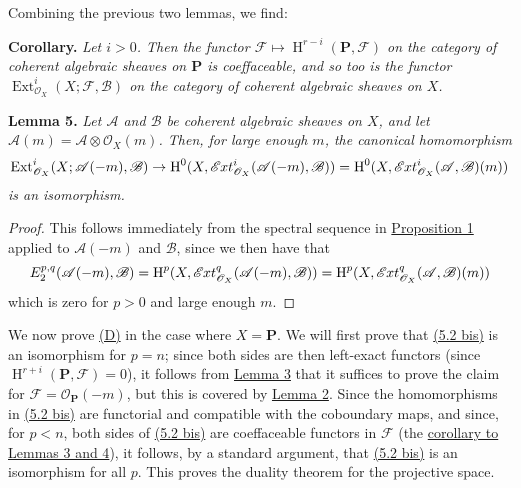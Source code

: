 \documentclass{article}
\newenvironment{itenv}[1]
  {\phantomsection\par\smallskip\noindent\textbf{#1.}\itshape}
  {\par\smallskip}
\newcommand{\oldpage}[1]{\marginpar{\footnotesize$\Big\vert$ \textit{p.~#1}}}
\theoremstyle{definition}
\theoremstyle{definition}
\theoremstyle{definition}
\theoremstyle{definition}
\theoremstyle{remark}
\begin{document}
Combining the previous two lemmas, we find:

\leavevmode{}%
\begin{itenv}{Corollary}
Let \(i>0\).
Then the functor \({\mathscr{F}}\mapsto\operatorname{H}^{r-i}(\mathbf{P},{\mathscr{F}})\) on the category of coherent algebraic sheaves on \(\mathbf{P}\) is coeffaceable, and so too is the functor \(\operatorname{Ext}_{{\mathscr{O}}_X}^i(X;{\mathscr{F}},{\mathscr{B}})\) on the category of coherent algebraic sheaves on \(X\).

\end{itenv}

\leavevmode{}%
\begin{itenv}{Lemma 5}
\oldpage{149-16}Let \({\mathscr{A}}\) and \({\mathscr{B}}\) be coherent algebraic sheaves on \(X\), and let \({\mathscr{A}}(m)={\mathscr{A}}\otimes{\mathscr{O}}_X(m)\).
Then, for large enough \(m\), the canonical homomorphism
\[
  \operatorname{Ext}_{{\mathscr{O}}_X}^i(X;{\mathscr{A}}(-m),{\mathscr{B}})
  \to \operatorname{H}^0(X,\mathscr{E}\kern -.5pt xt_{{\mathscr{O}}_X}^i({\mathscr{A}}(-m),{\mathscr{B}}))
  = \operatorname{H}^0(X,\mathscr{E}\kern -.5pt xt_{{\mathscr{O}}_X}^i({\mathscr{A}},{\mathscr{B}})(m))
\]
is an isomorphism.

\end{itenv}

\begin{proof}
This follows immediately from the spectral sequence in \protect\hyperlink{fga-1-proposition-1}{Proposition 1} applied to \({\mathscr{A}}(-m)\) and \({\mathscr{B}}\), since we then have that
\[
  E_2^{p,q}({\mathscr{A}}(-m),{\mathscr{B}})
  = \operatorname{H}^p(X,\mathscr{E}\kern -.5pt xt_{{\mathscr{O}}_X}^q({\mathscr{A}}(-m),{\mathscr{B}}))
  = \operatorname{H}^p(X,\mathscr{E}\kern -.5pt xt_{{\mathscr{O}}_X}^q({\mathscr{A}},{\mathscr{B}})(m))
\]
which is zero for \(p>0\) and large enough \(m\).
\end{proof}

We now prove \protect\hyperlink{fga-1-D}{(D)} in the case where \(X=\mathbf{P}\).
We will first prove that \protect\hyperlink{fga-1-equation-5.2bis}{(5.2 bis)} is an isomorphism for \(p=n\);
since both sides are then left-exact functors (since \(\operatorname{H}^{r+i}(\mathbf{P},{\mathscr{F}})=0\)), it follows from \protect\hyperlink{fga-1-lemma-3}{Lemma 3} that it suffices to prove the claim for \({\mathscr{F}}={\mathscr{O}}_\mathbf{P}(-m)\), but this is covered by \protect\hyperlink{fga-1-lemma-2}{Lemma 2}.
Since the homomorphisms in \protect\hyperlink{fga-1-equation-5.2bis}{(5.2 bis)} are functorial and compatible with the coboundary maps, and since, for \(p<n\), both sides of \protect\hyperlink{fga-1-equation-5.2bis}{(5.2 bis)} are coeffaceable functors in \({\mathscr{F}}\) (the \protect\hyperlink{fga-1-lemma-3-and-lemma-4-corollary}{corollary to Lemmas 3 and 4}), it follows, by a standard argument, that \protect\hyperlink{fga-1-equation-5.2bis}{(5.2 bis)} is an isomorphism for all \(p\).
This proves the duality theorem for the projective space.
\end{document}
